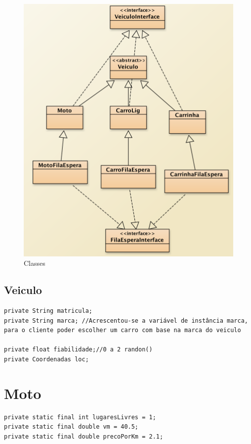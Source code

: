 \begin{figure}[htpb]
	\centering
	\includegraphics[scale=0.6]{imagem/veiculo}
	\caption{Classes }
	\label{p2:fig:p2_veiculos}
\end{figure}

\subsection{Veiculo}

\begin{verbatim}
private String matricula; 
private String marca; //Acrescentou-se a variável de instância marca, 
para o cliente poder escolher um carro com base na marca do veiculo

private float fiabilidade;//0 a 2 randon()
private Coordenadas loc;
\end{verbatim}

\section{Moto}
\begin{verbatim}
private static final int lugaresLivres = 1;
private static final double vm = 40.5; 
private static final double precoPorKm = 2.1;
\end{verbatim}

